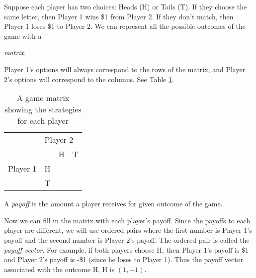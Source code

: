 Suppose each player has two choices: Heads (H) or Tails (T). If they choose the same letter, then Player 1 wins \$1 from Player 2. If they don't match, then Player 1 loses \$1 to Player 2. We can represent all the possible outcomes of the game with a {\emph{matrix}.  

Player 1's options will always correspond to the rows of the matrix, and Player 2's options will correspond to the columns. See Table \ref{T:template}.


\begin{table}[h]
\centering

\begin{tabular}{llll}
                      & \multicolumn{3}{l}{Player 2}                                                  \\ \cline{2-4} 
\multicolumn{1}{l|}{} & \multicolumn{1}{l|}{} & \multicolumn{1}{l|}{H} & \multicolumn{1}{l|}{T} \\ \cline{2-4} 
\multicolumn{1}{l|}{Player 1} & \multicolumn{1}{l|}{H} & \multicolumn{1}{l|}{} & \multicolumn{1}{l|}{} \\ \cline{2-4} 
\multicolumn{1}{l|}{} & \multicolumn{1}{l|}{T} & \multicolumn{1}{l|}{} & \multicolumn{1}{l|}{} \\ \cline{2-4} 
\end{tabular}
\caption{A game matrix showing the strategies for each player}
\label{T:template}
\end{table}\medskip

\begin{definition} A \emph{payoff} is the amount a player receives for  given outcome of the game.\end{definition}

Now we can fill in the matrix with each player's payoff. Since the payoffs to each player are different, we will use ordered pairs where the first number is Player 1's payoff and the second number is Player 2's payoff. The ordered pair is called the \emph{payoff vector}. For example, if both players choose H, then Player 1's payoff is \$1 and Player 2's payoff is -\$1 (since he loses to Player 1). Thus the payoff vector associated with the outcome H, H is $(1, -1)$. 

}
